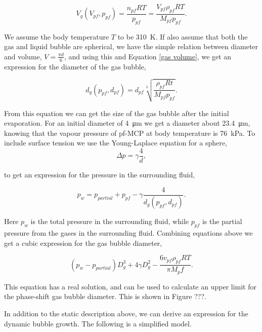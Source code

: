 \begin{equation}
\label{gas volume}
V_g(V_{pf}, p_{pf}) = \frac{n_{pf}RT}{p_{pf}}=\frac{V_{pf}\rho_{pf}RT}{M_{pf}p_{pf}}.
\end{equation}

We assume the body temperature $T$ to be \SI{310}{\kelvin}. If also assume that both the gas and liquid bubble are spherical, we have the simple relation between diameter and volume, $V = \frac{\pi d}{6}$, and using this and Equation \eqref{gas volume}, we get an expression for the diameter of the gas bubble, 

\begin{equation}
\label{diameter}
d_g(p_{pf}, d_{pf}) = d_{pf}\sqrt[3]{\frac{\rho_{pf}Rt}{M_{pf}p_{pf}}}.
\end{equation}

From this equation we can get the size of the gas bubble after the initial evaporation. For an initial diameter of \SI{4}{\micro\metre} we get a diameter about \SI{23.4}{\micro\metre}, knowing that the vapour pressure of pf-MCP at body temperature is \SI{76}{\kilo\pascal}\cite{Healey2013}.
To include surface tension we use the Young-Laplace equation for a sphere,
\begin{equation}
\label{Young-Laplace}
\Delta p = \gamma\frac{4}{d},
\end{equation}

to get an expression for the pressure in the surrounding fluid, 

\begin{equation}
p_w = p_{partial} + p_{pf} - \gamma \frac{4}{d_g(p_{pf}\mathrm{, } d_{pf})}.
\end{equation}

Here $p_w$ is the total pressure in the surrounding fluid, while $p_{pf}$ is the partial pressure from the gases in the surrounding fluid. Combining equations above we get a cubic expression for the gas bubble diameter,  

\begin{equation}
\label{cubic}
(p_w-p_{partial})D_g^3 + 4\gamma D_g^2 - \frac{6v_{pf}\rho_{pf}RT}{\pi M_pf}.
\end{equation}

This equation has a real solution, and can be used to calculate an upper limit for the phase-shift gas bubble diameter. This is shown in Figure ???.

In addition to the static description above, we can derive an expression for the dynamic bubble growth. The following is a simplified model.


